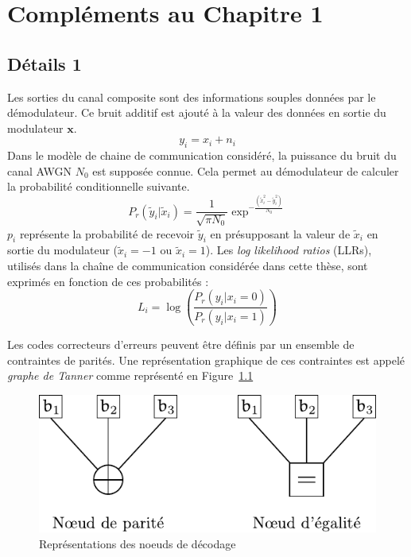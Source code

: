 
\appendix

\chapter{Compléments au Chapitre 1}
\section{Détails 1}\label{append:decoding_nodes}

Les sorties du canal composite sont des informations souples données par le démodulateur.
Ce bruit additif est ajouté à la valeur des données en sortie du modulateur $\mathbold{x}$.
\begin{equation}
y_i = x_i + n_i
\end{equation}
Dans le modèle de chaine de communication considéré, la puissance du bruit du canal AWGN $N_0$ est supposée connue.
Cela permet au démodulateur de calculer la probabilité conditionnelle suivante.
\begin{equation}
	P_r( \tilde{y}_i|\tilde{x}_i) = \dfrac{1}{\sqrt{\pi N_0}}\exp^{-\tfrac{(\tilde{x}_i^2-\tilde{y}_i^2)}{N_0}}
\end{equation}
$p_i$ représente la probabilité de recevoir $\tilde{y}_i$ en présupposant la valeur de $\tilde{x}_i$ en sortie du modulateur ($\tilde{x}_i=-1$ ou $\tilde{x}_i=1$). Les \textit{log likelihood ratios} (LLRs), utilisés dans la chaîne de communication considérée dans cette thèse, sont exprimés en fonction de ces probabilités :
\begin{equation}
	L_i = \log\left(\dfrac{P_r(y_i | x_i = 0)}{P_r(y_i | x_i = 1)}\right)
\end{equation}
  \label{eq:lr}

Les codes correcteurs d'erreurs peuvent être définis par un ensemble de contraintes de parités. Une représentation graphique de ces contraintes est appelé \textit{graphe de Tanner} comme représenté en Figure~\ref{fig:noeuds}

\begin{figure}[t]
\centering
\includegraphics{tail/appendix_1_fig/noeuds}
\caption{Représentations des noeuds de décodage}
\label{fig:noeuds}
\end{figure}

